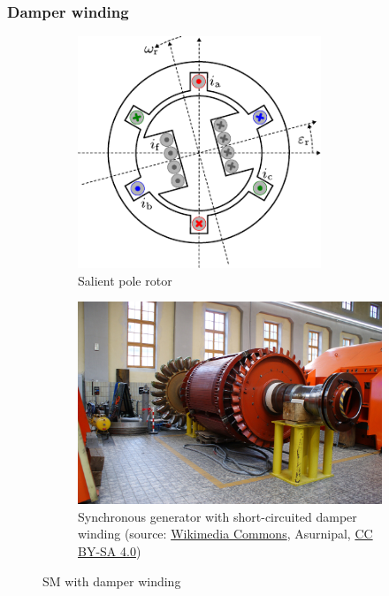 \begin{frame}
	\frametitle{Damper winding}
	\begin{figure}
		\centering
		\begin{subfigure}{0.49\textwidth}
			\centering
			\includegraphics[width=0.8\textwidth]{fig/lec07/SM_salient_pole.pdf}
			\caption{Salient pole rotor}
		\end{subfigure}
		\hfill
		\begin{subfigure}{0.49\textwidth}
			\centering
			\includegraphics[height=0.55\textheight]{fig/lec07/Pelton_wheel_rotor_02.jpg}
			\caption{Synchronous generator with short-circuited damper winding (source: \href{https://commons.wikimedia.org/wiki/File:Wald_am_Arlberg-OeBB_Spullersee_power_plant-M1-Rotor-11ASD.jpg}{Wikimedia Commons},  	Asurnipal, \href{https://creativecommons.org/licenses/by-sa/4.0/deed}{CC BY-SA 4.0})} 
		\end{subfigure}
        \caption{SM with damper winding} 
        \label{fig:SM_damper_winding}
	\end{figure}
\end{frame}